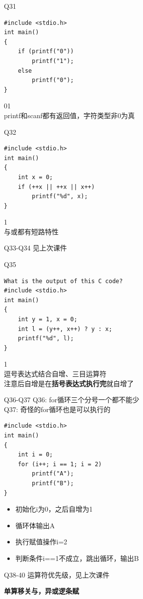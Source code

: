 \documentclass{myslide}
\begin{document}
\begin{frame}[fragile]{Q31}
\begin{lstlisting}
#include <stdio.h>
int main()
{
    if (printf("0"))
        printf("1");
    else
    	printf("0");
}
\end{lstlisting}
01\\
printf和scanf都有返回值，字符类型非0为真
\end{frame}

\begin{frame}[fragile]{Q32}
\begin{lstlisting}
#include <stdio.h>
int main()
{
    int x = 0;
    if (++x || ++x || x++)
        printf("%d", x);
}
\end{lstlisting}
1\\
与或都有短路特性
\end{frame}

\begin{frame}{Q33-Q34}
见上次课件
\end{frame}

\begin{frame}[fragile]{Q35}
\begin{lstlisting}
What is the output of this C code?
#include <stdio.h>
int main()
{
    int y = 1, x = 0;
    int l = (y++, x++) ? y : x;
    printf("%d", l);
}
\end{lstlisting}
1\\
逗号表达式结合自增、三目运算符\\
注意后自增是在\textbf{括号表达式执行完}就自增了
\end{frame}

\begin{frame}[fragile]{Q36-Q37}
Q36: for循环三个分号一个都不能少\\
Q37: 奇怪的for循环也是可以执行的
\begin{lstlisting}
#include <stdio.h>
int main()
{
    int i = 0;
    for (i++; i == 1; i = 2)
        printf("A");
        printf("B");
}
\end{lstlisting}
\begin{itemize}
	\item 初始化i为0，之后自增为1
	\item 循环体输出A
	\item 执行赋值操作i=2
	\item 判断条件i==1不成立，跳出循环，输出B
\end{itemize}
\end{frame}

\begin{frame}{Q38-40}
运算符优先级，见上次课件\\
\begin{center}
\Large\textbf{单算移关与，异或逻条赋}
\end{center}
\end{frame}
\end{document}
